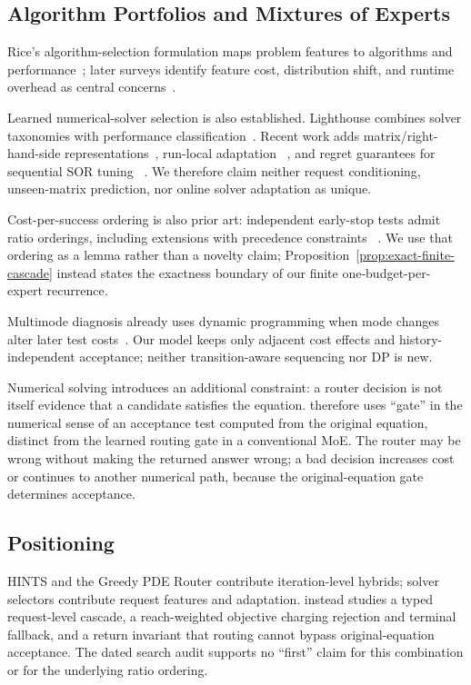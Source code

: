 \subsection{Algorithm Portfolios and Mixtures of Experts}

Rice's algorithm-selection formulation maps problem features to algorithms and
performance~\cite{rice1976}; later surveys identify feature cost, distribution
shift, and runtime overhead as central concerns~\cite{kotthoff2014}.

Learned numerical-solver selection is also established. Lighthouse combines solver
taxonomies with performance classification~\cite{jessup2016lighthouse}. Recent work
adds matrix/right-hand-side representations~\cite{zhang2026spectra}, run-local adaptation
~\cite{zabegaev2026datadriven}, and regret guarantees for sequential SOR tuning
~\cite{khodak2024relax}. We therefore claim neither request conditioning,
unseen-matrix prediction, nor online solver adaptation as unique.

Cost-per-success ordering is also prior art: independent early-stop tests admit
ratio orderings, including extensions with precedence constraints
~\cite{berend2014tests}. We use that ordering as a lemma rather than a novelty
claim; Proposition~\ref{prop:exact-finite-cascade} instead states the exactness
boundary of our finite one-budget-per-expert recurrence.

Multimode diagnosis already uses dynamic programming when mode changes alter later
test costs~\cite{ruan2004multimode}. Our model keeps only adjacent cost effects and
history-independent acceptance; neither transition-aware sequencing nor DP is new.

Numerical solving introduces an additional constraint: a router decision is not
itself evidence that a candidate satisfies the equation. \system therefore uses
``gate'' in the numerical sense of an acceptance test computed from the original
equation, distinct from the learned routing gate in a conventional MoE. The router may
be wrong without making the returned answer wrong; a bad decision increases cost or
continues to another numerical path, because the original-equation gate determines
acceptance.

\subsection{Positioning}

HINTS and the Greedy PDE Router contribute iteration-level hybrids; solver selectors
contribute request features and adaptation. \system instead studies a typed request-level
cascade, a reach-weighted objective charging rejection and terminal fallback, and a
return invariant that routing cannot bypass original-equation acceptance. The dated
search audit supports no ``first'' claim for this combination or for the underlying
ratio ordering.

